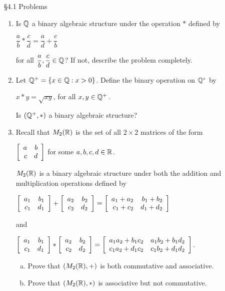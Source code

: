 \documentclass[11pt,fleqn,dvipsnames,usenames]{article}
\renewcommand{\headrulewidth}{1pt}
\begin{document}
\fancyhead[L]{\course}
\fancyhead[R]{\term}
\renewcommand{\headrulewidth}{0.4pt}

{\huge \S4.1 Problems}
\vsp

\begin{enumerate}[1.]
\item Is $\Q$ a binary algebraic structure under the operation $*$ defined by
\begin{center}
$\dfrac{a}{b}*\dfrac{c}{d} = \dfrac{a}{d} + \dfrac{c}{b}$
\end{center}
for all $\dfrac{a}{b},\dfrac{c}{d}\in \Q$?    If not, describe the problem completely.
\item Let $\Q^{+} = \SET{x\in\Q:x > 0}$.  Define the binary operation on $\Q^{*}$ by
\begin{center}
$x*y = \sqrt{xy}$, for all $x,y\in\Q^{+}$.
\end{center}
Is $(\Q^{+},*)$ a binary algebraic structure?

\item Recall that $M_{2}(\R)$ is the set of all $2\times 2$ matrices of the form
\begin{center}
$\MATRIX{rr}{a & b\\c& d}$ for some $a,b,c,d\in\R$.
\end{center}
$M_{2}(\R)$ is a binary algebraic structure under both the addition and multiplication operations defined by
\begin{center}
$\MATRIX{rr}{a_{1} & b_{1}\\c_{1} & d_{1}} + \MATRIX{rr}{a_{2} & b_{2}\\c_{2} & d_{2}} = \MATRIX{rr}{a_{1} + a_{2} & b_{1} + b_{2}\\c_{1} + c_{2} & d_{1} + d_{2}}$ 
\end{center}
and 
\begin{center}
$\MATRIX{rr}{a_{1} & b_{1}\\c_{1} & d_{1}} * \MATRIX{rr}{a_{2} & b_{2}\\c_{2} & d_{2}} = \MATRIX{rr}{a_{1}a_{2} + b_{1}c_{2} & a_{1}b_{2} + b_{1}d_{2}\\c_{1}a_{2} + d_{1}c_{2} & c_{1}b_{2} + d_{1}d_{2}}$.
\end{center}
\begin{enumerate}[(a)]
\item Prove that $(M_{2}(\R), +)$ is both commutative and associative.
\item Prove that $(M_{2}(\R), *)$ is associative but not commutative.
\end{enumerate}
\end{enumerate}
\vsp
\end{document}
